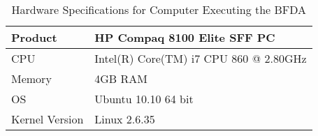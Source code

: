 \begin{table}[!h]
    \centering
    \caption{Hardware Specifications for Computer Executing the \ac{BFDA}}
    \label{tab:hwbf}
    \begin{tabular}{| l | l |}
	\hline
	Product		        &HP Compaq 8100 Elite SFF PC \\
	\hline
	CPU		            &Intel(R) Core(TM) i7 CPU 860 @ 2.80GHz\\
	\hline
	Memory	            &4GB \ac{RAM}\\
	\hline
	OS		            &Ubuntu 10.10 64 bit\\
	\hline
	Kernel Version	    &Linux 2.6.35\\
	\hline
    \end{tabular}
\end{table}
